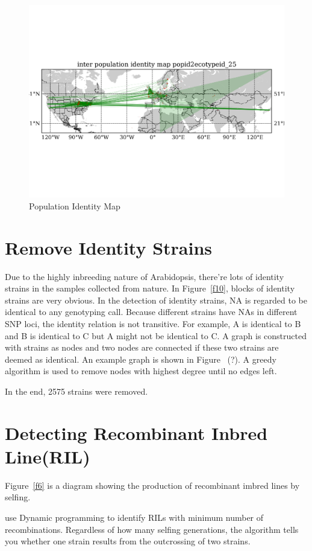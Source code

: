 \documentclass[a4paper,10pt]{article}
\begin{document}
\begin{figure}
\includegraphics[width=1\textwidth]{figures/identity_map1_site_network.png}
\caption{Population Identity Map}\label{f22}
\end{figure}

\section{Remove Identity Strains}
Due to the highly inbreeding nature of Arabidopsis, there're lots of identity strains in the samples collected from nature. In Figure~\ref{f10}, blocks of identity strains are very obvious. In the detection of identity strains, NA is regarded to be identical to any genotyping call. Because different strains have NAs in different SNP loci, the identity relation is not transitive. For example, A is identical to B and B is identical to C but A might not be identical to C. A graph is constructed with strains as nodes and two nodes are connected if these two strains are deemed as identical. An example graph is shown in Figure ~(?). A greedy algorithm is used to remove nodes with highest degree until no edges left.

In the end, 2575 strains were removed.


\section{Detecting Recombinant Inbred Line(RIL)}
Figure~\ref{f6} is a diagram showing the production of recombinant imbred lines by selfing.

use Dynamic programming to identify RILs with minimum number of recombinations. Regardless of how many selfing generations, the algorithm tells you whether one strain results from the outcrossing of two strains.
\end{document}
